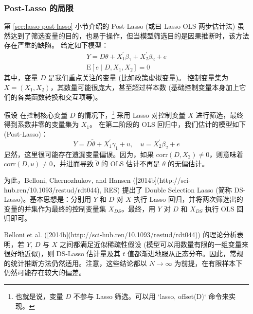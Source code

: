 \subsubsection{Post-Lasso 的局限}
第 \ref{sec:lasso-post-lasso} 小节介绍的 Post-Lasso (或曰 Lasso-OLS 两步估计法) 虽然达到了筛选变量的目的，也易于操作，但当模型筛选目的是因果推断时，该方法存在严重的缺陷。
给定如下模型：
\begin{equation}\label{eq:lasso-DS-01}
\begin{aligned}%
Y =D \theta + X_1^{\prime} \beta_1 + X_2^{\prime} \beta_2 + e \\
\mathrm{E}[e \mid D, X_1, X_2] =0
\end{aligned}
\end{equation}
其中，变量 $D$ 是我们重点关注的变量 (比如政策虚拟变量)。
控制变量集为 $X = (X_1, X_2)$，其数量可能很庞大，甚至超过样本数 (基础控制变量本身加上它们的各类函数转换和交互项等)。

假设%
在控制核心变量 $D$ 的情况下，\footnote{%
   也就是说，变量 $D$ 不参与 Lasso 筛选。可以用 `lasso, offset(D)` 命令来实现。}
采用 Lasso 对控制变量 $X$ 进行筛选，最终得到系数非零的变量集为 $X_1$。
在第二阶段的 OLS 回归中，我们估计的模型如下 (Post-Lasso)：
\begin{equation}\label{eq:lasso-DS-02}
Y =D \widetilde{\theta} + X_1^{\prime} \gamma_1 + u, \quad u= X_2^{\prime} \beta_2 + e
\end{equation}
显然，这里很可能存在遗漏变量偏误。因为，如果 $\mathrm{corr}(D,X_2) \neq 0$，则意味着 $\mathrm{corr}(D,u)\neq 0$，并进而导致 ${\widetilde{\theta}}$ 的 OLS 估计不再是 $\theta$ 的无偏估计。 

为此，Belloni, Chernozhukov, and Hansen ([2014b](http://sci-hub.ren/10.1093/restud/rdt044), RES) 提出了 Double Selection Lasso (简称 DS-Lasso)。基本思想是：分别用 $Y$ 和 $D$ 对 $X$ 执行 Lasso 回归，并将两次筛选出的变量的并集作为最终的控制变量集 $X_{DS}$。最终，用 $Y$ 对 $D$ 和 $X_{DS}$ 执行 OLS 回归即可。

Belloni et al. ([2014b](http://sci-hub.ren/10.1093/restud/rdt044)) 的理论分析表明，若 $Y$, $D$ 与 $X$ 之间都满足近似稀疏性假设 (模型可以用数量有限的一组变量来很好地近似)，则 DS-Lasso 估计量及其 $t$ 值都渐进地服从正态分布。因此，常规的统计推断方法仍然适用。注意，这些结论都以 $N \to \infty$ 为前提，在有限样本下仍然可能存在较大的偏差。%

